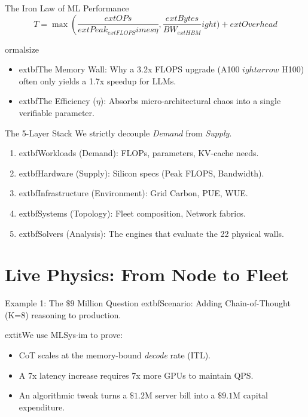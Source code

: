 \documentclass[aspectratio=169, 10pt]{beamer}
\begin{document}
\begin{frame}{The Iron Law of ML Performance}
    \centering
    \Large
    $$ T = \max\left( \frac{	ext{OPs}}{	ext{Peak}_{	ext{FLOPS}} 	imes \eta}, \frac{	ext{Bytes}}{BW_{	ext{HBM}}} 
ight) + 	ext{Overhead} $$
    \vspace{0.5cm}
    
    
ormalsize
    \begin{itemize}
        \item 	extbf{The Memory Wall:} Why a 3.2x FLOPS upgrade (A100 $
ightarrow$ H100) often only yields a 1.7x speedup for LLMs.
        \item 	extbf{The Efficiency ($\eta$):} Absorbs micro-architectural chaos into a single verifiable parameter.
    \end{itemize}
\end{frame}

\begin{frame}{The 5-Layer Stack}
    We strictly decouple \emph{Demand} from \emph{Supply}.
    \vspace{0.3cm}
    
    \begin{enumerate}
        \item 	extbf{Workloads (Demand):} FLOPs, parameters, KV-cache needs.
        \item 	extbf{Hardware (Supply):} Silicon specs (Peak FLOPS, Bandwidth).
        \item 	extbf{Infrastructure (Environment):} Grid Carbon, PUE, WUE.
        \item 	extbf{Systems (Topology):} Fleet composition, Network fabrics.
        \item 	extbf{Solvers (Analysis):} The engines that evaluate the 22 physical walls.
    \end{enumerate}
\end{frame}

\section{Live Physics: From Node to Fleet}

\begin{frame}{Example 1: The $\$9$ Million Question}
    	extbf{Scenario:} Adding Chain-of-Thought (K=8) reasoning to production.
    
    \vspace{0.3cm}
    	extit{We use MLSys$\cdot$im to prove:}
    \begin{itemize}
        \item CoT scales at the memory-bound \emph{decode} rate (ITL).
        \item A 7x latency increase requires 7x more GPUs to maintain QPS.
        \item An algorithmic tweak turns a $\$1.2$M server bill into a $\$9.1$M capital expenditure.
    \end{itemize}
\end{frame}
\end{document}
